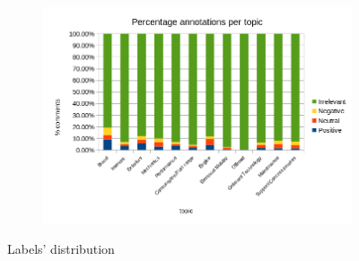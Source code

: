 \begin{figure}[ht]
	\centering
	\begin{subfigure}{1\textwidth} %
		\includegraphics[width=1\textwidth]{figures/charts/annotations-distribution-perc.png}
		\label{fig:annotations-distribution-perc}
	\end{subfigure}
	\caption{Labels' distribution} %
	\label{fig:annotations}
\end{figure}

